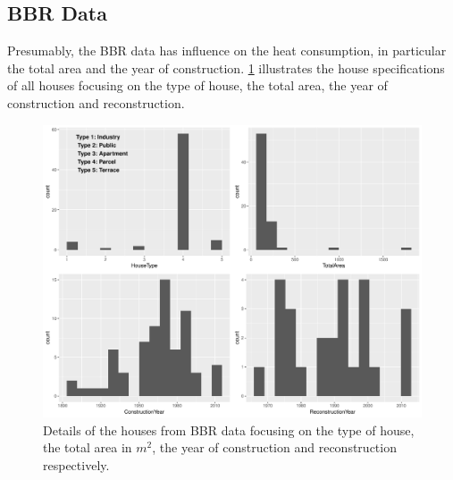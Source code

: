 \subsection{BBR Data}
Presumably, the BBR data has influence on the heat consumption, in particular the total area and the year of construction. \cref{fig: bbr_hist} illustrates the house specifications of all houses focusing on the type of house, the total area, the year of construction and reconstruction. 
\begin{figure}
    \centering
    \includegraphics[width=1.\textwidth]{../../../figures/bbr_hist.pdf}
    \caption{Details of the houses from BBR data focusing on the type of house, the total area in $m^2$, the year of construction and reconstruction respectively.}
    \label{fig: bbr_hist}
\end{figure}


